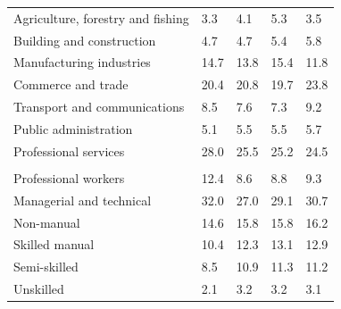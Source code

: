 \documentclass{article}
\begin{document}
\begin{table}[h]
\begin{tabular}{KTTTT}
    \hline
Agriculture, forestry and fishing  & 3.3& 4.1& 5.3& 3.5\\
Building and construction & 4.7& 4.7& 5.4& 5.8\\
Manufacturing industries & 14.7& 13.8& 15.4& 11.8\\
Commerce and trade  & 20.4& 20.8& 19.7& 23.8\\
Transport and communications  & 8.5& 7.6& 7.3& 9.2\\
Public administration & 5.1& 5.5& 5.5& 5.7\\
Professional services & 28.0& 25.5& 25.2& 24.5\\
\hline
    \\ 
    \hline
Professional workers  & 12.4&  8.6 &  8.8&  9.3\\
Managerial and technical & 32.0& 27.0& 29.1& 30.7\\
Non-manual & 14.6& 15.8& 15.8& 16.2\\
Skilled manual & 10.4& 12.3& 13.1& 12.9\\
Semi-skilled &  8.5& 10.9& 11.3& 11.2\\
Unskilled  & 2.1& 3.2& 3.2& 3.1\\
\end{tabular}
\end{table}
\pagebreak
\end{document}
